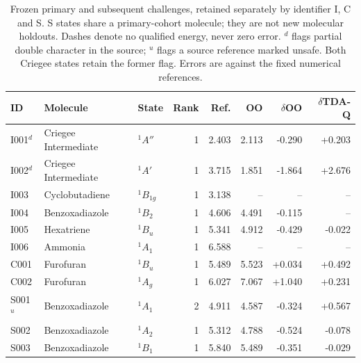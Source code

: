 \begin{table}[!htbp]
\centering\small
\caption{Frozen primary and subsequent challenges, retained separately by identifier I, C and S. S states share a primary-cohort molecule; they are not new molecular holdouts. Dashes denote no qualified energy, never zero error. $^d$ flags partial double character in the source; $^u$ flags a source reference marked unsafe. Both Criegee states retain the former flag. Errors are against the fixed numerical references.}\label{tab:finalindependent}
\begin{tabular}{lllrrrrr}
\toprule
ID & Molecule & State & Rank & Ref. & OO & $\delta$OO & $\delta$TDA-Q \\
\midrule
I001$^{d}$ & Criegee Intermediate & $^1A''$ & 1 & 2.403 & 2.113 & -0.290 & +0.203 \\
I002$^{d}$ & Criegee Intermediate & $^1A'$ & 1 & 3.715 & 1.851 & -1.864 & +2.676 \\
I003 & Cyclobutadiene & $^1B_{1g}$ & 1 & 3.138 & -- & -- & -- \\
I004 & Benzoxadiazole & $^1B_2$ & 1 & 4.606 & 4.491 & -0.115 & -- \\
I005 & Hexatriene & $^1B_u$ & 1 & 5.341 & 4.912 & -0.429 & -0.022 \\
I006 & Ammonia & $^1A_1$ & 1 & 6.588 & -- & -- & -- \\
C001 & Furofuran & $^1B_u$ & 1 & 5.489 & 5.523 & +0.034 & +0.492 \\
C002 & Furofuran & $^1A_g$ & 1 & 6.027 & 7.067 & +1.040 & +0.231 \\
S001$^{u}$ & Benzoxadiazole & $^1A_1$ & 2 & 4.911 & 4.587 & -0.324 & +0.567 \\
S002 & Benzoxadiazole & $^1A_2$ & 1 & 5.312 & 4.788 & -0.524 & -0.078 \\
S003 & Benzoxadiazole & $^1B_1$ & 1 & 5.840 & 5.489 & -0.351 & -0.029 \\
\bottomrule
\end{tabular}
\end{table}
